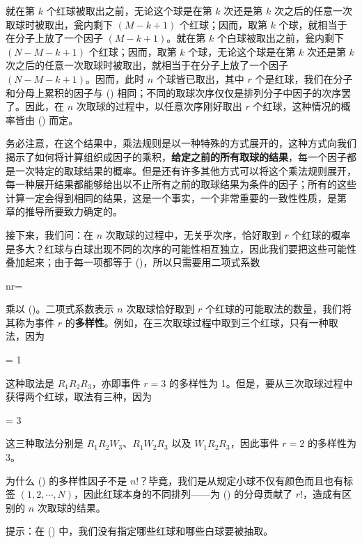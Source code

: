 就在第 $k$ 个红球被取出之前，无论这个球是在第 $k$ 次还是第 $k$ 次之后的任意一次取球时被取出，瓮内剩下 $(M - k + 1)$ 个红球；因而，取第 $k$ 个球，就相当于在分子上放了一个因子 $(M - k + 1)$。就在第 $k$ 个白球被取出之前，瓮内剩下 $(N - M - k + 1)$ 个红球；因而，取第 $k$ 个球，无论这个球是在第 $k$ 次还是第 $k$ 次之后的任意一次取球时被取出，就相当于在分子上放了一个因子 $(N - M - k + 1)$。因而，此时 $n$ 个球皆已取出，其中 $r$ 个是红球，我们在分子和分母上累积的因子与 (\in[3-17]) 相同；不同的取球次序仅仅是排列分子中因子的次序罢了。因此，在 $n$ 次取球的过程中，以任意次序刚好取出 $r$ 个红球，这种情况的概率皆由 (\in[3-15]) 而定。

务必注意，在这个结果中，乘法规则是以一种特殊的方式展开的，这种方式向我们揭示了如何将计算组织成因子的乘积，{\bf 给定之前的所有取球的结果}，每一个因子都是一次特定的取球结果的概率。但是还有许多其他方式可以将这个乘法规则展开，每一种展开结果都能够给出以不止所有之前的取球结果为条件的因子；所有的这些计算一定会得到相同的结果，这是一个事实，一个非常重要的一致性性质，是第  章的推导所要致力确定的。

接下来，我们问：在 $n$ 次取球的过程中，无关乎次序，恰好取到 $r$ 个红球的概率是多大？红球与白球出现不同的次序的可能性相互独立，因此我们要把这些可能性叠加起来；由于每一项都等于 (\in[3-15])，所以只需要用二项式系数

\placeformula[3-18]
\startformula
\startpmatrix n\NR r\NR\stoppmatrix = 
\stopformula

乘以 (\in[3-15])。二项式系数表示 $n$ 次取球恰好取到 $r$ 个红球的可能取法的数量，我们将其称为事件 $r$ 的{\bf 多样性}。例如，在三次取球过程中取到三个红球，只有一种取法，因为

\placeformula[3-19]
\startformula
{}\NR\stoppmatrix = 1
\stopformula

这种取法是 $R_1R_2R_3$，亦即事件 $r = 3$ 的多样性为 1。但是，要从三次取球过程中获得两个红球，取法有三种，因为

\placeformula[3-20]
\startformula
{}\NR\stoppmatrix = 3
\stopformula

这三种取法分别是 $R_1R_2W_3$、$R_1W_2R_3$ 以及 $W_1R_2R_3$，因此事件 $r = 2$ 的多样性为 $3$。

\startExercise
为什么 (\in[3-18]) 的多样性因子不是 $n!$？毕竟，我们是从规定小球不仅有颜色而且也有标签 $(1,2,\cdots,N)$，因此红球本身的不同排列——为 (\in[3-18]) 的分母贡献了 $r!$，造成有区别的 $n$ 次取球的结果。

提示：在 (\in[3-15]) 中，我们没有指定哪些红球和哪些白球要被抽取。
\stopExercise

